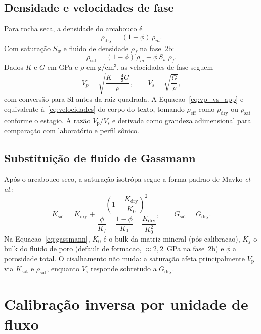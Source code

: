 \documentclass[11pt,a4paper]{article}
\numberwithin{equation}{section}
\newcommand{\Vp}{\ensuremath{V_{\mathrm{p}}}}
\newcommand{\Vs}{\ensuremath{V_{\mathrm{s}}}}
\newcommand{\VpVs}{\ensuremath{V_{\mathrm{p}}/V_{\mathrm{s}}}}
\begin{document}
\subsection{Densidade e velocidades de fase}
\label{app:vel}

Para rocha seca, a densidade do arcabouco é
\begin{equation}
  \rho_{\mathrm{dry}} = (1-\phi)\,\rho_m.
  \label{eq:rho_dry}
\end{equation}
Com saturação $S_w$ e fluido de densidade $\rho_f$ na fase~2b:
\begin{equation}
  \rho_{\mathrm{sat}} = (1-\phi)\,\rho_m + \phi\,S_w\,\rho_f.
  \label{eq:rho_sat}
\end{equation}
Dados $K$ e $G$ em GPa e $\rho$ em g/cm$^3$, as velocidades de fase seguem
\begin{equation}
  V_p = \sqrt{\frac{K + \frac{4}{3}G}{\rho}},
  \qquad
  V_s = \sqrt{\frac{G}{\rho}},
  \label{eq:vp_vs_app}
\end{equation}
com conversão para SI antes da raiz quadrada.
A Equacao~\eqref{eq:vp_vs_app} e equivalente à~\eqref{eq:velocidades} do
corpo do texto, tomando $\rho_{\mathrm{eff}}$ como $\rho_{\mathrm{dry}}$ ou
$\rho_{\mathrm{sat}}$ conforme o estagio.
A razão \VpVs{} e derivada como grandeza adimensional para comparação com
laboratório e perfil sônico.

\subsection{Substituição de fluido de Gassmann}
\label{app:gassmann}

Após o arcabouco seco, a saturação isotrópa segue a forma padrao de Mavko
\emph{et al.}:
\begin{equation}
  K_{\mathrm{sat}} = K_{\mathrm{dry}}
  + \frac{\left(1 - \dfrac{K_{\mathrm{dry}}}{K_0}\right)^2}
         {\dfrac{\phi}{K_f} + \dfrac{1-\phi}{K_0}
          - \dfrac{K_{\mathrm{dry}}}{K_0^2}},
  \qquad
  G_{\mathrm{sat}} = G_{\mathrm{dry}}.
  \label{eq:gassmann}
\end{equation}
Na Equacao~\eqref{eq:gassmann}, $K_0$ é o bulk da matriz mineral
(pós-calibracao), $K_f$ o bulk do fluido de poro (default de formacao,
$\approx 2{,}2$~GPa na fase~2b) e $\phi$ a porosidade total.
O cisalhamento não muda: a saturação afeta principalmente \Vp{} via
$K_{\mathrm{sat}}$ e $\rho_{\mathrm{sat}}$, enquanto \Vs{} responde sobretudo
a $G_{\mathrm{dry}}$.

\section{Calibração inversa por unidade de fluxo}
\label{app:dem_calib}
\end{document}
